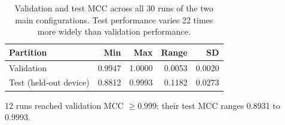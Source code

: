 \begin{table}[htbp]
\centering
\caption{Validation and test MCC across all 30 runs of the two main configurations. Test performance varies 22 times more widely than validation performance.}
\label{tab:val-vs-test}
\small
\begin{tabular}{lrrrr}
\toprule
Partition & Min & Max & Range & SD \\
\midrule
Validation & 0.9947 & 1.0000 & 0.0053 & 0.0020 \\
Test (held-out device) & 0.8812 & 0.9993 & 0.1182 & 0.0273 \\
\bottomrule
\end{tabular}
\vspace{2pt}
\footnotesize 12 runs reached validation MCC $\geq 0.999$; their test MCC ranges 0.8931 to 0.9993.
\end{table}
